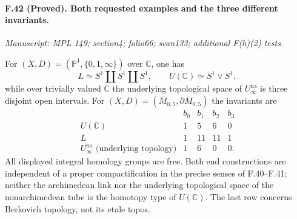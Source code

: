 \paragraph{F.42 (Proved). Both requested examples and the three different invariants.}
\textit{Manuscript: MPL 149; section4; folio66; scan133; additional F(h)(2) tests.}

For $(X,D)=(\mathbb P^1,\{0,1,\infty\})$ over $\mathbb C$, one has
\[
 L\simeq S^1\amalg S^1\amalg S^1,\qquad
 U(\mathbb C)\simeq S^1\vee S^1,
\]
while over trivially valued $\mathbb C$ the underlying topological space
of $U_\infty^{\mathrm{na}}$ is three disjoint open intervals. For
$(X,D)=(\overline M_{0,5},\partial\overline M_{0,5})$ the invariants are
\[
\begin{array}{c|rrrr}
 &b_0&b_1&b_2&b_3\\\hline
 U(\mathbb C)&1&5&6&0\\
 L&1&11&11&1\\
 U_\infty^{\mathrm{na}}\text{ (underlying topology)}&1&6&0&0.
\end{array}
\]
All displayed integral homology groups are free. Both end constructions
are independent of a proper compactification in the precise senses of
F.40--F.41; neither the archimedean link nor the underlying topological
space of the nonarchimedean tube is the homotopy type of $U(\mathbb C)$.
The last row concerns Berkovich topology, not its etale topos.

